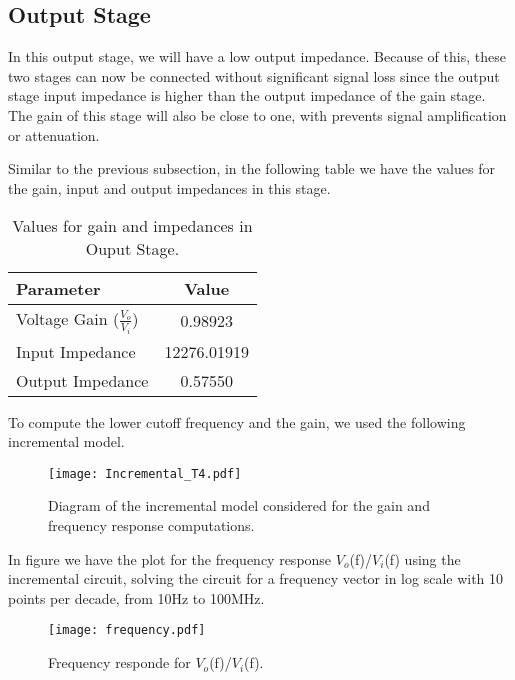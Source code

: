 \subsection{Output Stage}
\label{sec:output}


In this output stage, we will have a low output impedance. Because of this, these two stages can now be connected without significant signal loss since the output stage input impedance is higher than the output impedance of the gain stage. The gain of this stage will also be close to one, with prevents signal amplification or attenuation.

Similar to the previous subsection, in the following table we have the values for the gain, input and output impedances in this stage.

\begin{table}[h]
    \centering
    \begin{tabular}{|l|c|}
    \hline
    {\bf Parameter} & {\bf Value} \\ \hline \hline
    Voltage Gain ($\frac{V_{o}}{V_{i}}$)  & 0.98923\\ \hline
    Input Impedance & 12276.01919\\ \hline
    Output Impedance  & 0.57550  \\ \hline
    \end{tabular}
    \caption{Values for gain and impedances in Ouput Stage.}
    \label{tab:values}
\end{table}

To compute the lower cutoff frequency and the gain, we used the following incremental model.

\begin{figure}[ht!] \centering
\texttt{[image: Incremental\_T4.pdf]}

\caption{Diagram of the incremental model considered for the gain and frequency response computations.}
\label{fig:diagram_t4}
\end{figure}



In figure we have the plot for the frequency response $V_o$(f)/$V_i$(f) using the incremental circuit, solving the circuit for a frequency vector in log scale with 10 points per decade, from 10Hz to 100MHz.

\begin{figure}[!ht] \centering
\squeezeup
\squeezeup
\squeezeup
\squeezeup
\squeezeup
\squeezeup
    \texttt{[image: frequency.pdf]}
    \squeezeup
    \squeezeup
    \squeezeup
    \squeezeup
    \squeezeup
    \squeezeup
    \caption{Frequency responde for $V_o$(f)/$V_i$(f).}
    \label{fig:output}
\end{figure}

